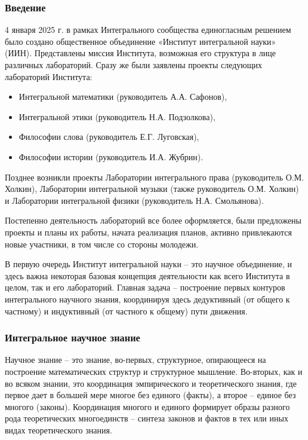     \subsubsection*{Введение}
    4 января 2025 г. в рамках Интегрального сообщества единогласным решением было создано общественное объединение «Институт интегральной науки» (ИИН). Представлены миссия Института, возможная его структура в лице различных лабораторий. Сразу же были заявлены проекты следующих лабораторий Института: 
    \begin{itemize}
        \item Интегральной математики (руководитель А.А. Сафонов),
        \item Интегральной этики (руководитель Н.А. Подзолкова),
        \item Философии слова (руководитель Е.Г. Луговская),
        \item Философии истории (руководитель И.А. Жубрин).
    \end{itemize}

    Позднее возникли проекты Лаборатории интегрального права (руководитель О.М. Холкин), Лаборатории интегральной музыки (также руководитель О.М. Холкин) и Лаборатории интегральной физики (руководитель Н.А. Смольянова).

    Постепенно деятельность лабораторий все более оформляется, были предложены проекты и планы их работы, начата реализация планов, активно привлекаются новые участники, в том числе со стороны молодежи.

    В первую очередь Институт интегральной науки – это научное объединение, и здесь важна некоторая базовая концепция деятельности как всего Института в целом, так и его лабораторий. Главная задача – построение первых контуров интегрального научного знания, координируя здесь дедуктивный (от общего к частному) и индуктивный (от частного к общему) пути движения.

    \subsubsection*{Интегральное научное знание}
    Научное знание – это знание, во-первых, структурное, опирающееся на построение математических структур и структурное мышление. Во-вторых, как и во всяком знании, это координация эмпирического и теоретического знания, где первое дает в большей мере многое без единого (факты), а второе – единое без многого (законы). Координация многого и единого формирует образы разного рода теоретических многоединств – синтеза законов и фактов в тех или иных видах теоретического знания.

